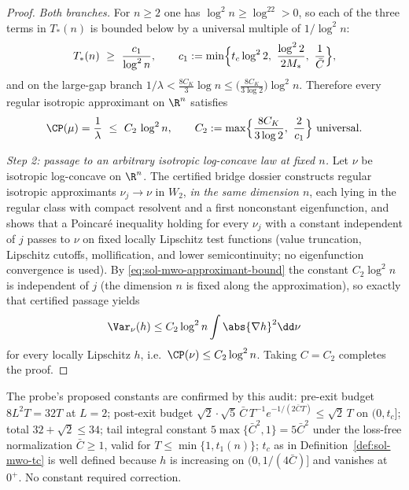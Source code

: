 \documentclass[../main.tex]{subfiles}
\begin{document}
\begin{proof}
\emph{Both branches.}  For $n\ge2$ one has $\log^2n\ge\log^22>0$, so each of the three
terms in $T_*(n)$ is bounded below by a universal multiple of $1/\log^2n$:
\[
  T_*(n)\ \ge\ \frac{c_1}{\log^2n},
  \qquad
  c_1:=\min\Bigl\{t_c\log^22,\ \frac{\log^22}{2M_*},\ \frac1{\bar C}\Bigr\},
\]
and on the large-gap branch
$1/\lambda<\tfrac{8C_K}3\log n\le\bigl(\tfrac{8C_K}{3\log2}\bigr)\log^2n$.  Therefore
every regular isotropic approximant on $\R^n$ satisfies
\begin{equation}
  \CP(\mu)=\frac1\lambda\ \le\ C_2\,\log^2n,
  \qquad
  C_2:=\max\Bigl\{\frac{8C_K}{3\log2},\ \frac2{c_1}\Bigr\}\ \text{universal}.
  \label{eq:sol-mwo-approximant-bound}
\end{equation}

\emph{Step 2: passage to an arbitrary isotropic log-concave law at fixed $n$.}
Let $\nu$ be isotropic log-concave on $\R^n$.  The certified bridge dossier constructs
regular isotropic approximants $\nu_j\to\nu$ in $W_2$, \emph{in the same dimension
$n$}, each lying in the regular class with compact resolvent and a first nonconstant
eigenfunction, and shows that a Poincar\'e inequality holding for every $\nu_j$ with a
constant independent of $j$ passes to $\nu$ on fixed locally Lipschitz test functions
(value truncation, Lipschitz cutoffs, mollification, and lower semicontinuity; no
eigenfunction convergence is used).  By \eqref{eq:sol-mwo-approximant-bound} the
constant $C_2\log^2n$ is independent of $j$ (the dimension $n$ is fixed along the
approximation), so exactly that certified passage yields
\[
  \Var_\nu(h)\le C_2\log^2n\int\abs{\nabla h}^2\dd\nu
\]
for every locally Lipschitz $h$, i.e.\ $\CP(\nu)\le C_2\log^2n$.  Taking $C=C_2$
completes the proof.
\end{proof}

\begin{remark}
\label{rem:sol-mwo-constants}
The probe's proposed constants are confirmed by this audit: pre-exit budget
$8L^2T=32T$ at $L=2$; post-exit budget
$\sqrt2\cdot\sqrt{5}\,\bar C\,T^{-1}e^{-1/(2\bar CT)}\le\sqrt2\,T$ on $(0,t_c]$; total
$32+\sqrt2\le34$; tail integral constant $5\max\{\bar C^2,1\}=5\bar C^2$ under the
loss-free normalization $\bar C\ge1$, valid for $T\le\min\{1,t_1(n)\}$; $t_c$ as in
Definition~\ref{def:sol-mwo-tc} is well defined because
$h$ is increasing on $(0,1/(4\bar C)]$ and vanishes at $0^+$.  No constant required
correction.
\end{remark}
\end{document}
